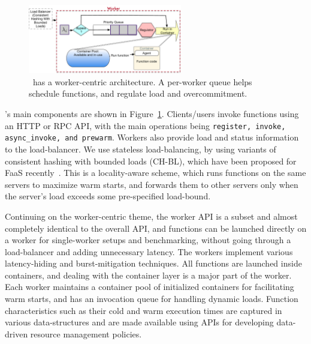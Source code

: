\begin{figure}
  \centering 
  \includegraphics[width=0.6\textwidth]{iluvatar/figs/il76-q.pdf}
  \caption{\sysname~has a worker-centric architecture. A per-worker queue helps schedule functions, and regulate load and overcommitment. }
  \label{fig:arch}
\end{figure}

\sysname's main components are shown in Figure~\ref{fig:arch}.
Clients/users invoke functions using an HTTP or RPC API, with the main operations being \texttt{register, invoke, async\_invoke, and prewarm}.
Workers also provide load and status information to the load-balancer. 
We use stateless load-balancing, by using variants of consistent hashing with bounded loads (CH-BL), which have been proposed for FaaS recently~\cite{faaslb-hpdc22}. 
This is a locality-aware scheme, which runs functions on the same servers to maximize warm starts, and forwards them to other servers only when the server's load exceeds some pre-specified load-bound.


Continuing on the worker-centric theme, the worker API is a subset and almost completely identical to the overall API, and functions can be launched directly on a worker for single-worker setups and benchmarking, without going through a load-balancer and adding unnecessary latency.
The workers implement various latency-hiding and burst-mitigation techniques. 
All functions are launched inside containers, and dealing with the container layer is a major part of the worker. 
Each worker maintains a container pool of initialized containers for facilitating warm starts, and has an invocation queue for handling dynamic loads.
Function characteristics such as their cold and warm execution times are captured in various data-structures and are made available using APIs for developing data-driven resource management policies.

